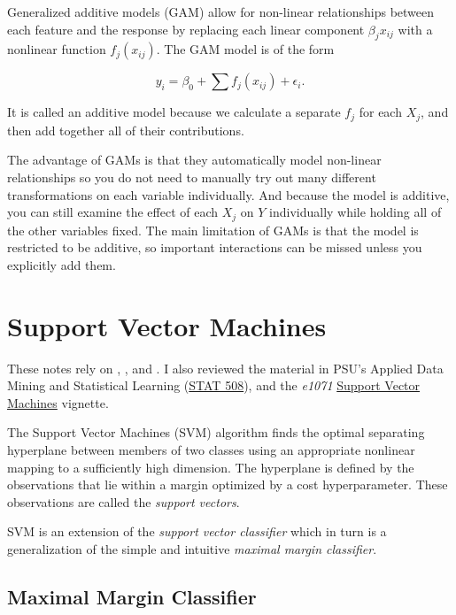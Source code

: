 \documentclass[
]{book}
\begin{document}
Generalized additive models (GAM) allow for non-linear relationships between each feature and the response by replacing each linear component \(\beta_j x_{ij}\) with a nonlinear function \(f_j(x_{ij})\). The GAM model is of the form

\[y_i = \beta_0 + \sum{f_j(x_{ij})} + \epsilon_i.\]

It is called an additive model because we calculate a separate \(f_j\) for each \(X_j\), and then add together all of their contributions.

The advantage of GAMs is that they automatically model non-linear relationships so you do not need to manually try out many diﬀerent transformations on each variable individually. And because the model is additive, you can still examine the eﬀect of each \(X_j\) on \(Y\) individually while holding all of the other variables ﬁxed. The main limitation of GAMs is that the model is restricted to be additive, so important interactions can be missed unless you explicitly add them.

\hypertarget{support-vector-machines}{%
\chapter{Support Vector Machines}\label{support-vector-machines}}

These notes rely on \citep{James2013}, \citep{Hastie2017}, and \citep{Kuhn2016}. I also reviewed the material in PSU's Applied Data Mining and Statistical Learning (\href{https://online.stat.psu.edu/stat508/}{STAT 508}), and the \emph{e1071} \href{https://cran.r-project.org/web/packages/e1071/vignettes/svmdoc.pdf}{Support Vector Machines} vignette.

The Support Vector Machines (SVM) algorithm finds the optimal separating hyperplane between members of two classes using an appropriate nonlinear mapping to a sufficiently high dimension. The hyperplane is defined by the observations that lie within a margin optimized by a cost hyperparameter. These observations are called the \emph{support vectors}.

SVM is an extension of the \emph{support vector classifier} which in turn is a generalization of the simple and intuitive \emph{maximal margin classifier}.

\hypertarget{maximal-margin-classifier}{%
\section{Maximal Margin Classifier}\label{maximal-margin-classifier}}
\end{document}
